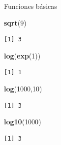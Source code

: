 \documentclass[
  ignorenonframetext,
  aspectratio=169]{beamer}
\newenvironment{Shaded}{\begin{snugshade}}{\end{snugshade}}
\newcommand{\DecValTok}[1]{\textcolor[rgb]{0.00,0.00,0.81}{#1}}
\newcommand{\FunctionTok}[1]{\textcolor[rgb]{0.13,0.29,0.53}{\textbf{#1}}}
\newcommand{\NormalTok}[1]{#1}
\begin{document}
\begin{frame}[fragile]{Funciones básicas}
\label{funciones-buxe1sicas-1}
\begin{Shaded}
\begin{Highlighting}[]
\FunctionTok{sqrt}\NormalTok{(}\DecValTok{9}\NormalTok{)}
\end{Highlighting}
\end{Shaded}

\begin{verbatim}
[1] 3
\end{verbatim}

\begin{Shaded}
\begin{Highlighting}[]
\FunctionTok{log}\NormalTok{(}\FunctionTok{exp}\NormalTok{(}\DecValTok{1}\NormalTok{))}
\end{Highlighting}
\end{Shaded}

\begin{verbatim}
[1] 1
\end{verbatim}

\begin{Shaded}
\begin{Highlighting}[]
\FunctionTok{log}\NormalTok{(}\DecValTok{1000}\NormalTok{,}\DecValTok{10}\NormalTok{)}
\end{Highlighting}
\end{Shaded}

\begin{verbatim}
[1] 3
\end{verbatim}

\begin{Shaded}
\begin{Highlighting}[]
\FunctionTok{log10}\NormalTok{(}\DecValTok{1000}\NormalTok{)}
\end{Highlighting}
\end{Shaded}

\begin{verbatim}
[1] 3
\end{verbatim}
\end{frame}
\end{document}
